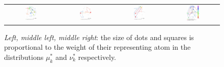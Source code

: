 \begin{figure}[t]
\begin{tabular}{@{}c@{}c@{}c@{}c@{}}
\includegraphics[width=0.24\textwidth]{figures/dual_MOT_1_neg_norm.png}&
\includegraphics[width=0.24\textwidth]{figures/dual_MOT_2_neg_norm.png}&
\includegraphics[width=0.24\textwidth]{figures/dual_MOT_3_neg_norm.png}&
\includegraphics[width=0.275\textwidth]{figures/dual_MOT_1_2_3_neg_norm.png}
\end{tabular}
\caption{\emph{Left, middle left, middle right}: the size of dots and squares is proportional to the weight of their representing atom in the distributions $\mu_k^{*}$ and $\nu_k^{*}$ respectively. %
}
\end{figure}
